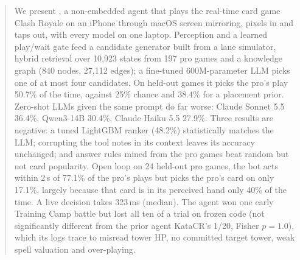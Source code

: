\begin{abstract}
We present \cb{}, a non-embedded agent that plays the real-time card game Clash Royale on an iPhone through macOS screen mirroring, pixels in and taps out, with every model on one laptop. Perception and a learned play/wait gate feed a candidate generator built from a lane simulator, hybrid retrieval over 10,923 states from 197 pro games and a knowledge graph (840 nodes, 27,112 edges); a fine-tuned 600M-parameter LLM picks one of at most four candidates. On held-out games it picks the pro's play 50.7\% of the time, against 25\% chance and 38.4\% for a placement prior. Zero-shot LLMs given the same prompt do far worse: Claude Sonnet 5.5 36.4\%, Qwen3-14B 30.4\%, Claude Haiku 5.5 27.9\%. Three results are negative: a tuned LightGBM ranker (48.2\%) statistically matches the LLM; corrupting the tool notes in its context leaves its accuracy unchanged; and answer rules mined from the pro games beat random but not card popularity. Open loop on 24 held-out pro games, the bot acts within 2\,s of 77.1\% of the pro's plays but picks the pro's card on only 17.1\%, largely because that card is in its perceived hand only 40\% of the time. %
A live decision takes 323\,ms (median). The agent won one early Training Camp battle but lost all ten of a trial on frozen code (not significantly different from the prior agent KataCR's 1/20, Fisher $p=1.0$), which its logs trace to misread tower HP, no committed target tower, weak spell valuation and over-playing. %
\end{abstract}
